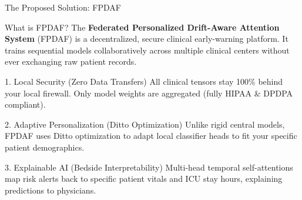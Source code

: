 \documentclass[aspectratio=169, 11pt]{beamer}
\begin{document}
\begin{frame}{The Proposed Solution: FPDAF}
    \begin{block}{What is FPDAF?}
        \scriptsize
        The \textbf{Federated Personalized Drift-Aware Attention System} (FPDAF) is a decentralized, secure clinical early-warning platform. It trains sequential models collaboratively across multiple clinical centers without ever exchanging raw patient records.
    \end{block}
    
    \begin{block}{1. Local Security (Zero Data Transfers)}
        \scriptsize
        All clinical tensors stay 100\% behind your local firewall. Only model weights are aggregated (fully HIPAA \& DPDPA compliant).
    \end{block}
    
    \begin{block}{2. Adaptive Personalization (Ditto Optimization)}
        \scriptsize
        Unlike rigid central models, FPDAF uses Ditto optimization to adapt local classifier heads to fit your specific patient demographics.
    \end{block}
    
    \begin{alertblock}{3. Explainable AI (Bedside Interpretability)}
        \scriptsize
        Multi-head temporal self-attentions map risk alerts back to specific patient vitals and ICU stay hours, explaining predictions to physicians.
    \end{alertblock}
\end{frame}
\end{document}
